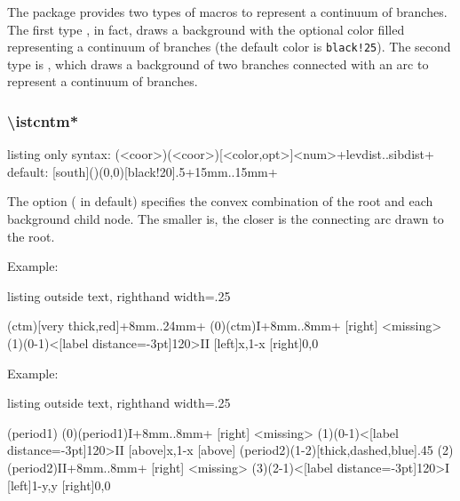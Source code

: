 The package  provides two types of macros to represent a continuum of branches.
The first type , in fact, draws a background with the optional color filled representing a continuum of branches (the default color is \verb|black!25|).
The second type is \cmd{\istcntm*}, which draws a background of two branches connected with an arc to represent a continuum of branches.

\subsubsection*{\textbackslash istcntm*}

\begin{tcblisting}{listing only}
syntax: (<coor>)(<coor>)[<color,opt>]{<num>}+levdist..sibdist+
default: [south]()(0,0)[black!20]{.5}+15mm..15mm+
\end{tcblisting}

The option  ( in default) specifies 
the convex combination of the root and each background child node.
The smaller  is, the closer is the connecting arc drawn to the root.


Example:

\begin{tcblisting}{listing outside text, righthand width=.25\linewidth}
\begin{istgame}[scale=1.2]
\istcntm*(ctm)[very thick,red]+8mm..24mm+
\istroot(0)(ctm){I}+8mm..8mm+
  [right]
  \istb<missing>
\endist
\xtdistance{10mm}{18mm}
\istroot(1)(0-1)<[label distance=-3pt]120>{II}
  [left]{x,1-x}
  [right]{0,0}
\endist
\end{istgame}
\end{tcblisting}

\clearpage
Example:

\begin{tcblisting}{listing outside text, righthand width=.25\linewidth}
\begin{istgame}[scale=1.2]
\istcntm(period1)
\istroot(0)(period1){I}+8mm..8mm+
  [right]
  \istb<missing>
\endist
\xtdistance{10mm}{20mm}
\istroot(1)(0-1)<[label distance=-3pt]120>{II}
  [above]{x,1-x}
  [above]
\endist
\istcntm*(period2)(1-2)[thick,dashed,blue]{.45}
\istroot(2)(period2){II}+8mm..8mm+
  [right]
  \istb<missing>
\endist
\xtdistance{10mm}{20mm}
\istroot(3)(2-1)<[label distance=-3pt]120>{I}
  [left]{1-y,y}
  [right]{0,0}
\endist
\end{istgame}
\end{tcblisting}

